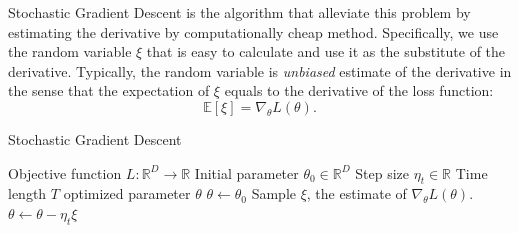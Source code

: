 \documentclass{amsart}
\theoremstyle{definition}
\theoremstyle{remark}
\numberwithin{equation}{section}
\begin{document}
Stochastic Gradient Descent is the algorithm that alleviate this problem
by estimating the derivative by computationally cheap method.
Specifically, we use the random variable $\xi$ that is easy to calculate and use it as the substitute of the derivative.
Typically, the random variable is \textit{unbiased} estimate of the derivative in the sense that the expectation of $\xi$ equals to the derivative of the loss function:
\begin{equation}
\mathbb{E}\left[ \xi \right] = \nabla_{\theta} L(\theta).
\end{equation}

\begin{algorithm}
\caption{Stochastic Gradient Descent}
\begin{algorithmic}
\REQUIRE Objective function $L:\mathbb{R}^D \to \mathbb{R}$
\REQUIRE Initial parameter $\theta_0 \in \mathbb{R}^D$
\REQUIRE Step size $\eta_t \in \mathbb{R}$
\REQUIRE Time length $T$
\ENSURE optimized parameter $\theta$
\STATE $\theta \leftarrow \theta_0$
\STATE Sample $\xi$, the estimate of $\nabla_\theta L(\theta)$.
\STATE $\theta \leftarrow \theta - \eta_t \xi$
\ENDFOR
\end{algorithmic}
\end{algorithm}
\end{document}
